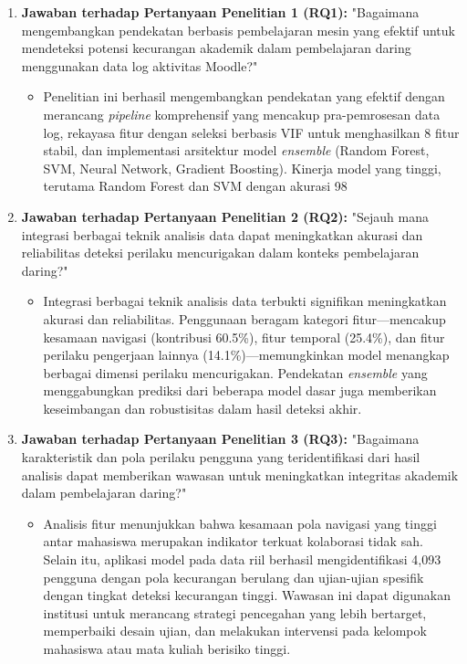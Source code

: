 \begin{enumerate}
\item \textbf{Jawaban terhadap Pertanyaan Penelitian 1 (RQ1):} "Bagaimana mengembangkan pendekatan berbasis pembelajaran mesin yang efektif untuk mendeteksi potensi kecurangan akademik dalam pembelajaran daring menggunakan data log aktivitas Moodle?"
\begin{itemize}
\item Penelitian ini berhasil mengembangkan pendekatan yang efektif dengan merancang \textit{pipeline} komprehensif yang mencakup pra-pemrosesan data log, rekayasa fitur dengan seleksi berbasis VIF untuk menghasilkan 8 fitur stabil, dan implementasi arsitektur model \textit{ensemble} (Random Forest, SVM, Neural Network, Gradient Boosting). Kinerja model yang tinggi, terutama Random Forest dan SVM dengan akurasi 98%
\end{itemize}

\item \textbf{Jawaban terhadap Pertanyaan Penelitian 2 (RQ2):} "Sejauh mana integrasi berbagai teknik analisis data dapat meningkatkan akurasi dan reliabilitas deteksi perilaku mencurigakan dalam konteks pembelajaran daring?"
\begin{itemize}
    \item Integrasi berbagai teknik analisis data terbukti signifikan meningkatkan akurasi dan reliabilitas. Penggunaan beragam kategori fitur---mencakup kesamaan navigasi (kontribusi 60.5\%), fitur temporal (25.4\%), dan fitur perilaku pengerjaan lainnya (14.1\%)---memungkinkan model menangkap berbagai dimensi perilaku mencurigakan. Pendekatan \textit{ensemble} yang menggabungkan prediksi dari beberapa model dasar juga memberikan keseimbangan dan robustisitas dalam hasil deteksi akhir.
\end{itemize}

\item \textbf{Jawaban terhadap Pertanyaan Penelitian 3 (RQ3):} "Bagaimana karakteristik dan pola perilaku pengguna yang teridentifikasi dari hasil analisis dapat memberikan wawasan untuk meningkatkan integritas akademik dalam pembelajaran daring?"
\begin{itemize}
    \item Analisis fitur menunjukkan bahwa kesamaan pola navigasi yang tinggi antar mahasiswa merupakan indikator terkuat kolaborasi tidak sah. Selain itu, aplikasi model pada data riil berhasil mengidentifikasi 4,093 pengguna dengan pola kecurangan berulang dan ujian-ujian spesifik dengan tingkat deteksi kecurangan tinggi. Wawasan ini dapat digunakan institusi untuk merancang strategi pencegahan yang lebih bertarget, memperbaiki desain ujian, dan melakukan intervensi pada kelompok mahasiswa atau mata kuliah berisiko tinggi.
\end{itemize}
\end{enumerate}

